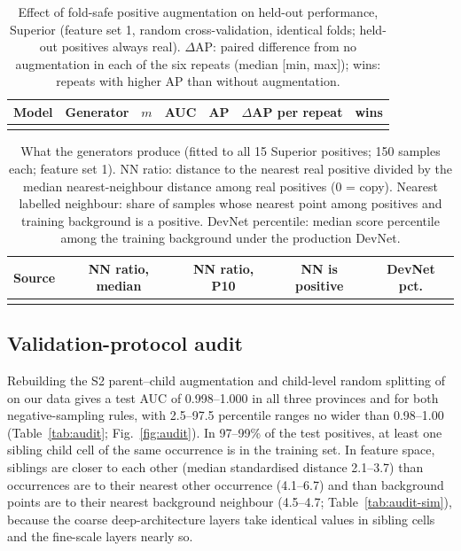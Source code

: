\documentclass[pdflatex,sn-apa]{sn-jnl}
\begin{document}
\begin{table}[t]
\caption{Effect of fold-safe positive augmentation on held-out performance, Superior (feature set 1, random cross-validation, identical folds; held-out positives always real). $\Delta$AP: paired difference from no augmentation in each of the six repeats (median [min, max]); wins: repeats with higher AP than without augmentation.}\label{tab:augmentation}
\scriptsize
\setlength{\tabcolsep}{2.5pt}
\begin{tabular*}{\textwidth}{@{\extracolsep\fill}lllcccc}
\toprule
Model & Generator & $m$ & AUC & AP & $\Delta$AP per repeat & wins \\
\midrule
\botrule
\end{tabular*}
\end{table}

\begin{table}[t]
\caption{What the generators produce (fitted to all 15 Superior positives; 150 samples each; feature set 1). NN ratio: distance to the nearest real positive divided by the median nearest-neighbour distance among real positives (0 = copy). Nearest labelled neighbour: share of samples whose nearest point among positives and training background is a positive. DevNet percentile: median score percentile among the training background under the production DevNet.}\label{tab:aug-diag}
\footnotesize
\setlength{\tabcolsep}{2.5pt}
\begin{tabular*}{\textwidth}{@{\extracolsep\fill}lcccc}
\toprule
Source & NN ratio, median & NN ratio, P10 & NN is positive & DevNet pct. \\
\midrule
\botrule
\end{tabular*}
\end{table}

\subsection{Validation-protocol audit}\label{sec:res-audit}

Rebuilding the S2 parent--child augmentation and child-level random splitting of \citet{Parsa2024} on our data gives a test AUC of 0.998--1.000 in all three provinces and for both negative-sampling rules, with 2.5--97.5 percentile ranges no wider than 0.98--1.00 (Table~\ref{tab:audit}; Fig.~\ref{fig:audit}). In 97--99\% of the test positives, at least one sibling child cell of the same occurrence is in the training set. In feature space, siblings are closer to each other (median standardised distance 2.1--3.7) than occurrences are to their nearest other occurrence (4.1--6.7) and than background points are to their nearest background neighbour (4.5--4.7; Table~\ref{tab:audit-sim}), because the coarse deep-architecture layers take identical values in sibling cells and the fine-scale layers nearly so.
\end{document}

